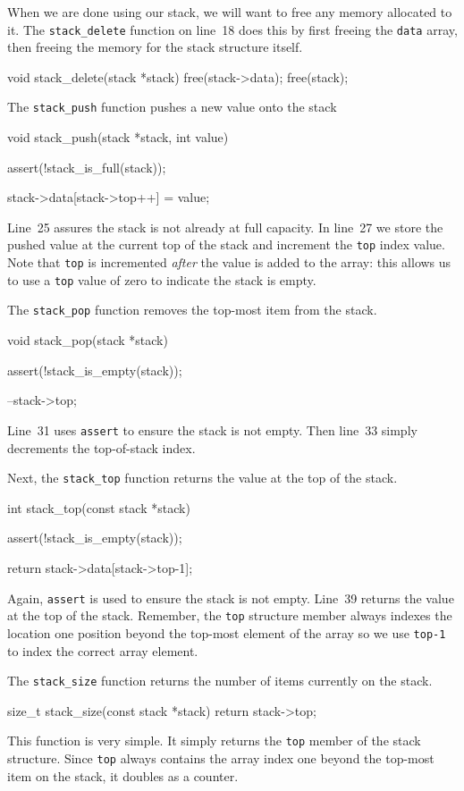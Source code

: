 \documentclass{article}
\begin{document}
  When we are done using our stack, we will want to free any memory allocated to it. The \verb|stack_delete| function on line~18 does this by first freeing the \verb|data| array, then freeing the memory for the stack structure itself.
  \begin{lstc}
void stack_delete(stack *stack)
{
  free(stack->data);
  free(stack);
}\end{lstc}

  The \verb|stack_push| function pushes a new value onto the stack
  \begin{lstc}
void stack_push(stack *stack, int value)
{
  assert(!stack_is_full(stack));

  stack->data[stack->top++] = value;
}\end{lstc}

  Line~25 assures the stack is not already at full capacity. In line~27 we store the pushed value at the current top of the stack and increment the \verb|top| index value. Note that \verb|top| is incremented \emph{after} the value is added to the array: this allows us to use a \verb|top| value of zero to indicate the stack is empty.

  The \verb|stack_pop| function removes the top-most item from the stack.
  \begin{lstc}
void stack_pop(stack *stack)
{
  assert(!stack_is_empty(stack));

  --stack->top;
}\end{lstc}
  Line~31 uses \verb|assert| to ensure the stack is not empty. Then line~33 simply decrements the top-of-stack index.

  Next, the \verb|stack_top| function returns the value at the top of the stack.
  \begin{lstc}
int stack_top(const stack *stack)
{
  assert(!stack_is_empty(stack));

  return stack->data[stack->top-1];
}\end{lstc}
  Again, \verb|assert| is used to ensure the stack is not empty. Line~39 returns the value at the top of the stack. Remember, the \verb|top| structure member always indexes the location one position beyond the top-most element of the array so we use \verb|top-1| to index the correct array element.

  The \verb|stack_size| function returns the number of items currently on the stack.
  \begin{lstc}
size_t stack_size(const stack *stack)
{
  return stack->top;
}\end{lstc}
  This function is very simple. It simply returns the \verb|top| member of the stack structure. Since \verb|top| always contains the array index one beyond the top-most item on the stack, it doubles as a counter.
\end{document}
